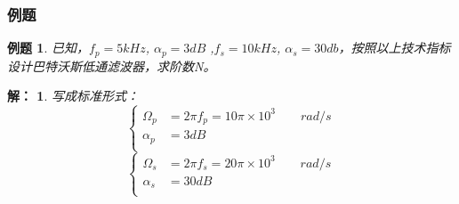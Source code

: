 \documentclass[notheorems,compress,mathserif,table]{beamer}
\newtheorem{example}{例题}
\newtheorem{answer}{解：}
\newtheorem{dablock}{}
\begin{document}
\begin{frame}\frametitle{例题}%
\begin{example}
已知，$f_p=5kHz$, $\alpha_p=3dB$ ,$f_s=10kHz$, $\alpha_s=30db$，按照以上技术指标设计巴特沃斯低通滤波器，求阶数N。
\end{example}
\begin{answer}
写成标准形式：
$$
\left\{
\begin{aligned}
\Omega_{p}  &=2\pi f_p= 10\pi \times 10^{3} \quad\quad rad/s\\
\alpha_{p}  &= 3 dB\quad\quad\quad\quad\quad\quad\quad\\
\end{aligned}
\right.
$$
$$
\left\{
\begin{aligned}
\Omega_{s}  &=2\pi f_s= 20\pi \times 10^{3} \quad\quad rad/s\\
\alpha_{s}  &= 30 dB\quad\quad\quad\quad\quad\quad\quad\\
\end{aligned}
\right.
$$

\end{answer}
\end{frame}
\end{document}

